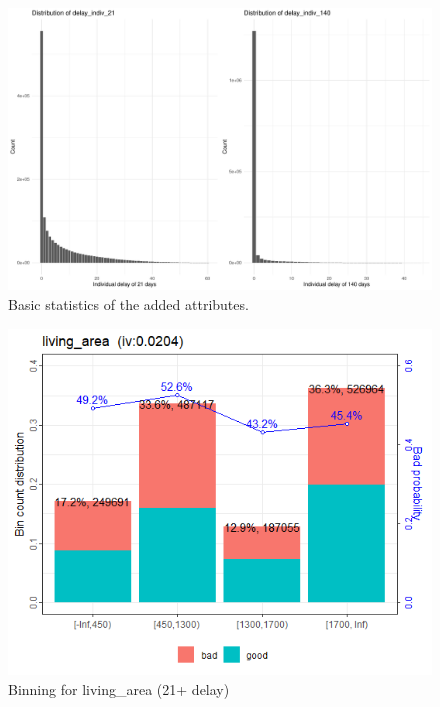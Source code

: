 \documentclass[
]{article}
\begin{document}
\begin{figure}
\includegraphics[height=0.4\textheight]{Documentation_Rmarkdown_files/figure-latex/statIndiv-1} \caption{\label{fig:stat-new}Basic statistics of the added attributes.}\label{fig:statIndiv}
\end{figure}

\begin{figure}
\centering
\includegraphics{.//WOE21.png}
\caption{\label{fig:woe21} Binning for living\_area (21+ delay)}
\end{figure}
\end{document}
